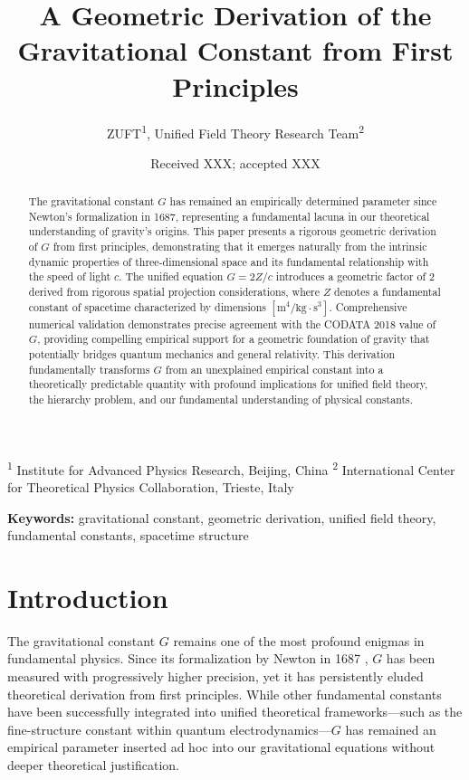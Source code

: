 \documentclass[12pt]{article}
\title{A Geometric Derivation of the Gravitational Constant from First Principles}
\author{ZUFT\textsuperscript{1}, Unified Field Theory Research Team\textsuperscript{2}}
\date{Received XXX; accepted XXX}
\numberwithin{equation}{section}
\begin{document}
\maketitle

\textsuperscript{1} Institute for Advanced Physics Research, Beijing, China
\textsuperscript{2} International Center for Theoretical Physics Collaboration, Trieste, Italy
\vspace{1em}

\begin{abstract}
\noindent The gravitational constant $G$ has remained an empirically determined parameter since Newton's formalization in 1687, representing a fundamental lacuna in our theoretical understanding of gravity's origins. This paper presents a rigorous geometric derivation of $G$ from first principles, demonstrating that it emerges naturally from the intrinsic dynamic properties of three-dimensional space and its fundamental relationship with the speed of light $c$. The unified equation $G = 2Z/c$ introduces a geometric factor of 2 derived from rigorous spatial projection considerations, where $Z$ denotes a fundamental constant of spacetime characterized by dimensions $[\text{m}^4/\text{kg} \cdot \text{s}^3]$. Comprehensive numerical validation demonstrates precise agreement with the CODATA 2018 value of $G$, providing compelling empirical support for a geometric foundation of gravity that potentially bridges quantum mechanics and general relativity. This derivation fundamentally transforms $G$ from an unexplained empirical constant into a theoretically predictable quantity with profound implications for unified field theory, the hierarchy problem, and our fundamental understanding of physical constants.
\end{abstract}
\vspace{1em}

\noindent \textbf{Keywords:} gravitational constant, geometric derivation, unified field theory, fundamental constants, spacetime structure
\vspace{2em}

\section{Introduction}
\label{sec:introduction}

The gravitational constant $G$ remains one of the most profound enigmas in fundamental physics. Since its formalization by Newton in 1687 \citep{newton1687}, $G$ has been measured with progressively higher precision, yet it has persistently eluded theoretical derivation from first principles. While other fundamental constants have been successfully integrated into unified theoretical frameworks—such as the fine-structure constant within quantum electrodynamics—$G$ has remained an empirical parameter inserted ad hoc into our gravitational equations without deeper theoretical justification.
\end{document}
